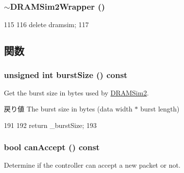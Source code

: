 \hypertarget{classDRAMSim2Wrapper_ae3508f5d656008b2209e4455d1649428}{
\subsubsection[{$\sim$DRAMSim2Wrapper}]{\setlength{\rightskip}{0pt plus 5cm}$\sim${\bf DRAMSim2Wrapper} ()}}
\label{classDRAMSim2Wrapper_ae3508f5d656008b2209e4455d1649428}



\begin{DoxyCode}
115 {
116     delete dramsim;
117 }
\end{DoxyCode}


\subsection{関数}
\hypertarget{classDRAMSim2Wrapper_ad4ebfa7de0b48f306bf4d5e736843d62}{
\subsubsection[{burstSize}]{\setlength{\rightskip}{0pt plus 5cm}unsigned int burstSize () const}}
\label{classDRAMSim2Wrapper_ad4ebfa7de0b48f306bf4d5e736843d62}
Get the burst size in bytes used by \hyperlink{classDRAMSim2}{DRAMSim2}.

\begin{DoxyReturn}{戻り値}
The burst size in bytes (data width $\ast$ burst length) 
\end{DoxyReturn}



\begin{DoxyCode}
191 {
192     return _burstSize;
193 }
\end{DoxyCode}
\hypertarget{classDRAMSim2Wrapper_a34b4e8ea869adbb57c71b30c55e6f5bd}{
\subsubsection[{canAccept}]{\setlength{\rightskip}{0pt plus 5cm}bool canAccept () const}}
\label{classDRAMSim2Wrapper_a34b4e8ea869adbb57c71b30c55e6f5bd}
Determine if the controller can accept a new packet or not.

